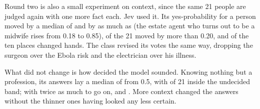 \documentclass[journal]{IEEEtran}
\begin{document}
Round two is also a small experiment on context, since the same 21 people are judged again with
one more fact each. Jev used it. Its yes-probability for a person moved by a median of
\ContextMedianShift{} and by as much as \ContextMaxShift{} (the estate agent who turns out to be a
midwife rises from 0.18 to 0.85), \ContextMovers{} of the 21 moved by more than 0.20, and
\ContextPlacesChanged{} of the ten places changed hands. The class revised its votes the same way,
dropping the surgeon over the Ebola risk and the electrician over his illness.

What did not change is how decided the model sounded. Knowing nothing but a profession, its
answers lay a median of \RoundOneDistHalf{} from 0.5, with \RoundOneInBand{} of 21 inside the
undecided band; with twice as much to go on, \RoundTwoDistHalf{} and \RoundTwoInBand. More context
changed the answers without the thinner ones having looked any less certain.
\end{document}
